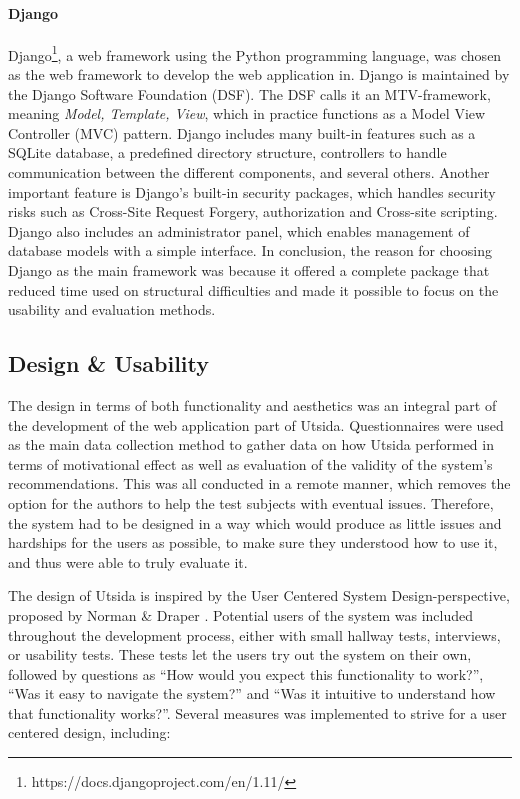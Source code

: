\paragraph{Django}\label{sec:django}

Django\footnote{https://docs.djangoproject.com/en/1.11/}, a web framework using the Python programming language, was chosen as the web framework to develop the web application in. Django is maintained by the Django Software Foundation (DSF). The DSF calls it an MTV-framework, meaning \emph{Model, Template, View}, which in practice functions as a Model View Controller (MVC) pattern. Django includes many built-in features such as a SQLite database, a predefined directory structure, controllers to handle communication between the different components, and several others. Another important feature is Django's built-in security packages, which handles security risks such as Cross-Site Request Forgery, authorization and Cross-site scripting. Django also includes an administrator panel, which enables management of database models with a simple interface. In conclusion, the reason for choosing Django as the main framework was because it offered a complete package that reduced time used on structural difficulties and made it possible to focus on the usability and evaluation methods.

\subsection{Design \& Usability}

The design in terms of both functionality and aesthetics was an integral part of the development of the web application part of Utsida. Questionnaires were used as the main data collection method to gather data on how Utsida performed in terms of motivational effect as well as evaluation of the validity of the system's recommendations. This was all conducted in a remote manner, which removes the option for the authors to help the test subjects with eventual issues. Therefore, the system had to be designed in a way which would produce as little issues and hardships for the users as possible, to make sure they understood how to use it, and thus were able to truly evaluate it.

The design of Utsida is inspired by the User Centered System Design-perspective, proposed by Norman \& Draper \cite{norman1986user}. Potential users of the system was included throughout the development process, either with small hallway tests, interviews, or usability tests. These tests let the users try out the system on their own, followed by questions as \enquote{How would you expect this functionality to work?}, \enquote{Was it easy to navigate the system?} and \enquote{Was it intuitive to understand how that functionality works?}. Several measures was implemented to strive for a user centered design, including:

